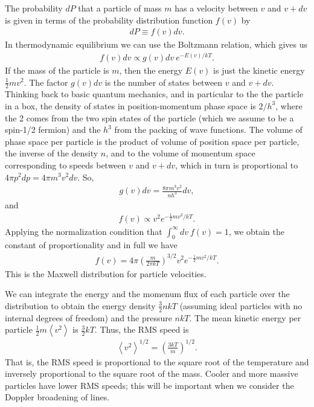 The probability $dP$ that a particle of mass $m$ has a velocity between
$v$ and $v+dv$ is given in terms of the probability distribution
function $f(v)$ by
\begin{align}
dP \equiv f(v) dv.
\end{align}
In thermodynamic equilibrium we can use the Boltzmann relation,
which gives us
\begin{align}
f(v) dv \propto g(v) dv\: e^{-E(v)/kT}.
\end{align}
If the mass of the particle is $m$, then the energy $E(v)$ is just the
kinetic energy $\frac{1}{2}mv^2$. The factor $g(v)dv$ is the number of
states between $v$ and $v+dv$. Thinking back to basic quantum mechanics,
and in particular to the the particle in a box, the density of states in
position-momentum phase space is $2/h^3$, where the 2 comes from the two
spin states of the particle (which we assume to be a spin-1/2 fermion)
and the $h^3$ from the packing of wave functions. The volume of phase
space per particle is the product of volume of position space per
particle, the inverse of the density $n$, and to the volume of momentum
space corresponding to speeds between $v$ and $v+dv$, which in turn is
proportional to $4\pi p^2 dp = 4\pi m^3v^2 dv$. So,
\begin{align}
g(v)dv = \frac{8\pi m^3 v^2}{n h^3} dv,
\end{align}
and
\begin{align}
f(v) \propto v^2 e^{-\frac{1}{2}m v^2/kT}.
\end{align}
Applying the normalization condition that $\int_0^\infty\!\!\!dv\:f(v) =
1$, we obtain the constant
of proportionality and in full we have
\begin{align}
f(v) = 4\pi\left(\frac{m}{2\pi k T}\right)^{3/2} v^2 e^{-\frac{1}{2}m v^2/kT}.
\end{align}
This is the Maxwell distribution for particle
velocities.

We can integrate the energy and the momenum flux of each particle over
the distribution to obtain the energy density $\frac{3}{2}nkT$ (assuming
ideal particles with no internal degrees of freedom) and the pressure
$nkT$. The mean kinetic energy per particle
$\frac{1}{2}m\left<v^2\right>$ is $\frac{3}{2}kT$. Thus, the RMS speed
is
\begin{align}
\left<v^2\right>^{1/2} = \left(\frac{3kT}{m}\right)^{1/2}.
\end{align}
That is, the RMS speed is proportional to the square root of the
temperature and inversely proportional to the square root of the mass.
Cooler and more massive particles have lower RMS speeds; this will be
important when we consider the Doppler broadening of lines.

